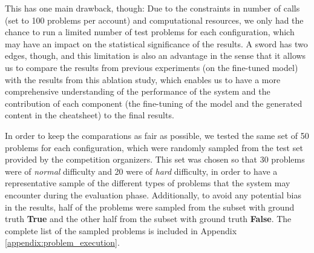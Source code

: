 \documentclass{article}
\begin{document}
This has one main drawback, though: Due to the constraints in number of calls (set to 100 problems per account) and computational resources, we only had the chance to run a limited number of test problems for each configuration, which may have an impact on the statistical significance of the results. A sword has two edges, though, and this limitation is also an advantage in the sense that it allows us to compare the results from previous experiments (on the fine-tuned model) with the results from this ablation study, which enables us to have a more comprehensive understanding of the performance of the system and the contribution of each component (the fine-tuning of the model and the generated content in the cheatsheet) to the final results.

In order to keep the comparations as fair as possible, we tested the same set of 50 problems for each configuration, which were randomly sampled from the test set provided by the competition organizers. This set was chosen so that 30 problems were of \textit{normal} difficulty and 20 were of \textit{hard} difficulty, in order to have a representative sample of the different types of problems that the system may encounter during the evaluation phase. Additionally, to avoid any potential bias in the results, half of the problems were sampled from the subset with ground truth \textbf{True} and the other half from the subset with ground truth \textbf{False}. The complete list of the sampled problems is included in Appendix \ref{appendix:problem_execution}.

\end{document}
